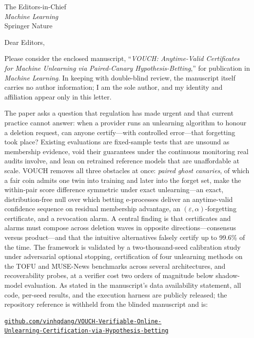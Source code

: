 \documentclass[10pt,a4paper]{letter}
\date{5 July 2026}
\begin{document}
\begin{letter}{The Editors-in-Chief\\\emph{Machine Learning}\\Springer Nature}

\opening{Dear Editors,}

Please consider the enclosed manuscript, ``\emph{VOUCH: Anytime-Valid
Certificates for Machine Unlearning via Paired-Canary Hypothesis-Betting},'' for
publication in \emph{Machine Learning}. In keeping with double-blind review, the
manuscript itself carries no author information; I am the sole author, and my
identity and affiliation appear only in this letter.

The paper asks a question that regulation has made urgent and that current
practice cannot answer: when a provider runs an unlearning algorithm to honour a
deletion request, can anyone certify---with controlled error---that forgetting
took place? Existing evaluations are fixed-sample tests that are unsound as
membership evidence, void their guarantees under the continuous monitoring real
audits involve, and lean on retrained reference models that are unaffordable at
scale. VOUCH removes all three obstacles at once: \emph{paired ghost canaries},
of which a fair coin admits one twin into training and later into the forget set,
make the within-pair score difference symmetric under exact unlearning---an exact,
distribution-free null over which betting e-processes deliver an anytime-valid
confidence sequence on residual membership advantage, an
$(\varepsilon,\alpha)$-forgetting certificate, and a revocation alarm. A central
finding is that certificates and alarms must compose across deletion waves in
opposite directions---consensus versus product---and that the intuitive
alternatives falsely certify up to 99.6\% of the time. The framework is validated
by a two-thousand-seed calibration study under adversarial optional stopping,
certification of four unlearning methods on the TOFU and MUSE-News benchmarks
across several architectures, and recoverability probes, at a verifier cost two
orders of magnitude below shadow-model evaluation. As stated in the manuscript's
data availability statement, all code, per-seed results, and the execution harness
are publicly released; the repository reference is withheld from the blinded
manuscript and is:
\begin{center}
\href{https://github.com/vinhqdang/VOUCH-Verifiable-Online-Unlearning-Certification-via-Hypothesis-betting}{\texttt{github.com/vinhqdang/VOUCH-Verifiable-Online-}\\\texttt{Unlearning-Certification-via-Hypothesis-betting}}
\end{center}


\end{letter}
\end{document}
